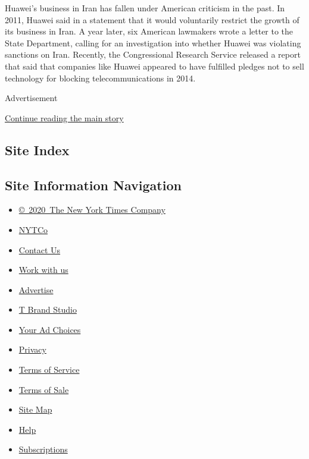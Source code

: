 Huawei's business in Iran has fallen under American criticism in the
past. In 2011, Huawei said in a statement that it would voluntarily
restrict the growth of its business in Iran. A year later, six American
lawmakers wrote a letter to the State Department, calling for an
investigation into whether Huawei was violating sanctions on Iran.
Recently, the Congressional Research Service released a report that said
that companies like Huawei appeared to have fulfilled pledges not to
sell technology for blocking telecommunications in 2014.

Advertisement

\protect\hyperlink{after-bottom}{Continue reading the main story}

\hypertarget{site-index}{%
\subsection{Site Index}\label{site-index}}

\hypertarget{site-information-navigation}{%
\subsection{Site Information
Navigation}\label{site-information-navigation}}

\begin{itemize}
\tightlist
\item
  \href{https://help.nytimes.com/hc/en-us/articles/115014792127-Copyright-notice}{©~2020~The
  New York Times Company}
\end{itemize}

\begin{itemize}
\tightlist
\item
  \href{https://www.nytco.com/}{NYTCo}
\item
  \href{https://help.nytimes.com/hc/en-us/articles/115015385887-Contact-Us}{Contact
  Us}
\item
  \href{https://www.nytco.com/careers/}{Work with us}
\item
  \href{https://nytmediakit.com/}{Advertise}
\item
  \href{http://www.tbrandstudio.com/}{T Brand Studio}
\item
  \href{https://www.nytimes.com/privacy/cookie-policy\#how-do-i-manage-trackers}{Your
  Ad Choices}
\item
  \href{https://www.nytimes.com/privacy}{Privacy}
\item
  \href{https://help.nytimes.com/hc/en-us/articles/115014893428-Terms-of-service}{Terms
  of Service}
\item
  \href{https://help.nytimes.com/hc/en-us/articles/115014893968-Terms-of-sale}{Terms
  of Sale}
\item
  \href{https://spiderbites.nytimes.com}{Site Map}
\item
  \href{https://help.nytimes.com/hc/en-us}{Help}
\item
  \href{https://www.nytimes.com/subscription?campaignId=37WXW}{Subscriptions}
\end{itemize}
